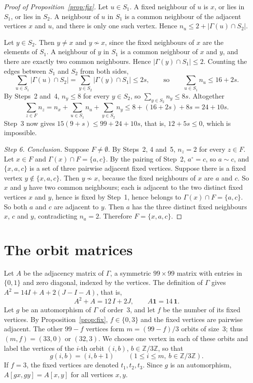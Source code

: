 \documentclass[11pt,a4paper]{article}
\theoremstyle{remark}
\newcommand{\ZZ}{\mathbb{Z}}
\newcommand{\one}{\mathbf{1}}
\begin{document}
\begin{proof}[Proof of Proposition~\ref{prop:fix}]
Let $u\in S_1$. A fixed neighbour of $u$ is $x$, or lies in $S_1$, or lies in $S_2$. A neighbour of $u$ in $S_1$ is a
common neighbour of the adjacent vertices $x$ and $u$, and there is only one such vertex. Hence
$n_u\le 2+|\Gamma(u)\cap S_2|$.

Let $y\in S_2$. Then $y\ne x$ and $y\not\sim x$, since the fixed neighbours of $x$ are the elements of $S_1$. A
neighbour of $y$ in $S_1$ is a common neighbour of $x$ and $y$, and there are exactly two common neighbours. Hence
$|\Gamma(y)\cap S_1|\le2$. Counting the edges between $S_1$ and $S_2$ from both sides,
\[
\sum_{u\in S_1}|\Gamma(u)\cap S_2|=\sum_{y\in S_2}|\Gamma(y)\cap S_1|\le 2s,
\qquad\text{so}\qquad \sum_{u\in S_1}n_u\le 16+2s .
\]
By Steps~2 and~4, $n_y\le8$ for every $y\in S_2$, so $\sum_{y\in S_2}n_y\le 8s$. Altogether
\[
\sum_{z\in F}n_z=n_x+\sum_{u\in S_1}n_u+\sum_{y\in S_2}n_y\le 8+(16+2s)+8s=24+10s .
\]
Step~3 now gives $15(9+s)\le 99+24+10s$, that is, $12+5s\le0$, which is impossible.

\medskip\noindent\emph{Step 6. Conclusion.}
Suppose $F\ne\emptyset$. By Steps~2, 4 and~5, $n_z=2$ for every $z\in F$. Let $x\in F$ and
$\Gamma(x)\cap F=\{a,c\}$. By the pairing of Step~2, $a^\circ=c$, so $a\sim c$, and $\{x,a,c\}$ is a set of three
pairwise adjacent fixed vertices. Suppose there is a fixed vertex $y\notin\{x,a,c\}$. Then $y\not\sim x$, because the
fixed neighbours of $x$ are $a$ and $c$. So $x$ and $y$ have two common neighbours; each is adjacent to the two
distinct fixed vertices $x$ and $y$, hence is fixed by Step~1, hence belongs to $\Gamma(x)\cap F=\{a,c\}$. So both $a$
and $c$ are adjacent to $y$. Then $a$ has the three distinct fixed neighbours $x$, $c$ and $y$, contradicting
$n_a=2$. Therefore $F=\{x,a,c\}$.
\end{proof}

\section{The orbit matrices}\label{sec:orbit}

Let $A$ be the adjacency matrix of $\Gamma$, a symmetric $99\times99$ matrix with entries in $\{0,1\}$ and zero
diagonal, indexed by the vertices. The definition of $\Gamma$ gives $A^2=14I+A+2(J-I-A)$, that is,
\begin{equation}\label{eq:srg}
A^2+A=12\,I+2J ,\qquad A\one=14\,\one .
\end{equation}
Let $g$ be an automorphism of $\Gamma$ of order~3, and let $f$ be the number of its fixed vertices. By
Proposition~\ref{prop:fix}, $f\in\{0,3\}$ and the fixed vertices are pairwise adjacent. The other $99-f$ vertices form
$m=(99-f)/3$ orbits of size~3; thus $(m,f)=(33,0)$ or $(32,3)$. We choose one vertex in each of these orbits and
label the vertices of the $i$-th orbit $(i,b)$, $b\in\ZZ/3\ZZ$, so that
\[
g(i,b)=(i,b+1)\qquad(1\le i\le m,\ b\in\ZZ/3\ZZ).
\]
If $f=3$, the fixed vertices are denoted $t_1,t_2,t_3$. Since $g$ is an automorphism, $A[gx,gy]=A[x,y]$ for all
vertices $x,y$.
\end{document}
